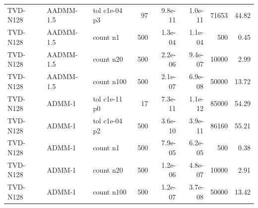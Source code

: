 \begin{tabular}{lllrrrrr}
TVD-N128 & AADMM-1.5 & tol c1e-04 p3 & 97 & 9.8e-11 & 1.0e-11 & 71653 & 44.82\\
TVD-N128 & AADMM-1.5 & count n1 & 500 & 1.3e-04 & 1.1e-04 & 500 & 0.45\\
TVD-N128 & AADMM-1.5 & count n20 & 500 & 2.2e-06 & 9.4e-07 & 10000 & 2.99\\
TVD-N128 & AADMM-1.5 & count n100 & 500 & 2.1e-07 & 6.9e-08 & 50000 & 13.72\\
TVD-N128 & ADMM-1 & tol c1e-11 p0 & 17 & 7.3e-11 & 1.1e-12 & 85000 & 54.29\\
TVD-N128 & ADMM-1 & tol c1e-04 p2 & 500 & 3.6e-10 & 3.9e-11 & 86160 & 55.21\\
TVD-N128 & ADMM-1 & count n1 & 500 & 7.9e-05 & 6.2e-05 & 500 & 0.38\\
TVD-N128 & ADMM-1 & count n20 & 500 & 1.2e-06 & 4.8e-07 & 10000 & 2.91\\
TVD-N128 & ADMM-1 & count n100 & 500 & 1.2e-07 & 3.7e-08 & 50000 & 13.42\\
\bottomrule
\end{tabular}
